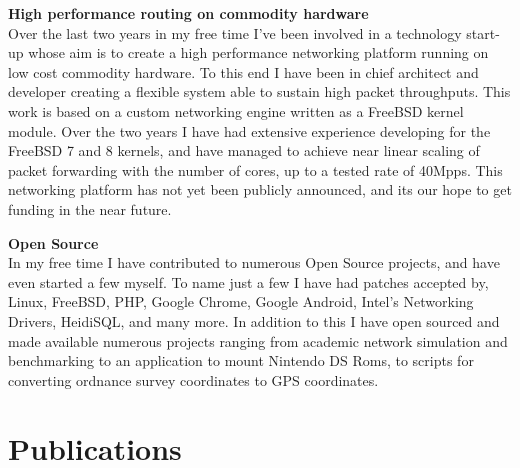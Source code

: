 \documentclass[a4paper,10pt]{article}
\begin{document}
 \textbf{High performance routing on commodity hardware}\\
 \footnotesize{Over the last two years in my free time I've been involved in a technology start-up whose aim is to create a high performance networking platform running on low cost commodity hardware. To this end I have been in chief architect and developer creating a flexible system able to sustain high packet throughputs. This work is based on a custom networking engine written as a FreeBSD kernel module. Over the two years I have had extensive experience developing for the FreeBSD 7 and 8 kernels, and have managed to achieve near linear scaling of packet forwarding with the number of cores, up to a tested rate of 40Mpps. This networking platform has not yet been publicly announced, and its our hope to get funding in the near future.}

 \textbf{Open Source}\\
 \footnotesize{In my free time I have contributed to numerous Open Source projects, and have even started a few myself. To name just a few I have had patches accepted by, Linux, FreeBSD, PHP, Google Chrome, Google Android, Intel's Networking Drivers, HeidiSQL, and many more. In addition to this I have open sourced and made available numerous projects ranging from academic network simulation and benchmarking to an application to mount Nintendo DS Roms, to scripts for converting ordnance survey coordinates to GPS coordinates. }

\section{Publications}
\begin{tabular}{rl}

\end{tabular}


\end{document}
